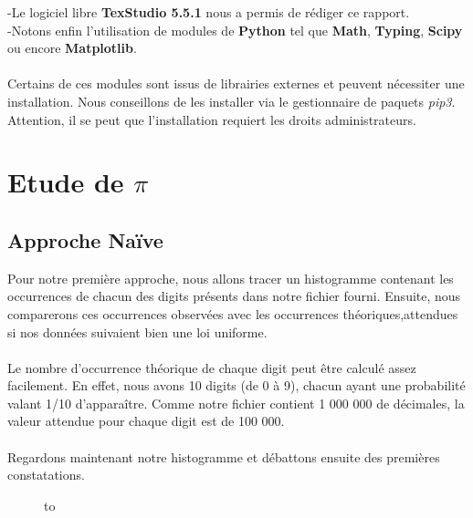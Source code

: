 \documentclass[french]{article}
\begin{document}
-Le logiciel libre \textbf{TexStudio 5.5.1} nous a permis de rédiger ce rapport.
\\

-Notons enfin l'utilisation de modules de \textbf{Python} tel que \textbf{Math}, \textbf{Typing}, \textbf{Scipy} ou encore \textbf{Matplotlib}.
\\
\\
Certains de ces modules sont issus de librairies externes et peuvent nécessiter une installation. Nous conseillons de les installer via le gestionnaire de paquets \textit{pip3}. Attention, il se peut que l'installation requiert les droits administrateurs.

\section{Etude de $\pi$ }
\subsection{Approche Naïve}
Pour notre première approche, nous allons tracer un histogramme contenant les occurrences de chacun des digits présents dans notre fichier fourni. Ensuite, nous comparerons ces occurrences observées avec les occurrences théoriques,attendues si nos données suivaient bien une loi uniforme. 
\\
\\
Le nombre d'occurrence théorique de chaque digit peut être calculé assez facilement. En effet, nous avons 10 digits (de 0 à 9), chacun ayant une probabilité valant 1/10 d'apparaître. Comme notre fichier contient 1 000 000 de décimales, la valeur attendue pour chaque digit est de 100 000.
\\
\\
Regardons maintenant notre histogramme et débattons ensuite des premières constatations.

\begin{figure}[h!]
	\hbox to
	\caption{\label{toucan}}
\end{figure}
\end{document}
